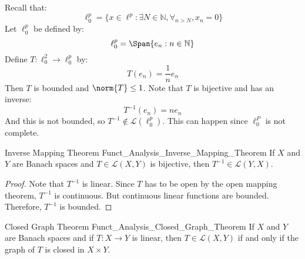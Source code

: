         \begin{lexample}
            Recall that:
            \begin{equation}
                \ell_{0}^{p}=
                \{x\in\ell^{p}:\exists{N\in\mathbb{N}},
                    \forall_{n>N},x_{n}=0\}
            \end{equation}
            Let $\ell_{0}^{p}$ be defined by:
            \begin{equation}
                \ell_{0}^{p}=\Span\{e_{n}:n\in\mathbb{N}\}
            \end{equation}
            Define $T:\ell_{0}^{2}\rightarrow\ell_{0}^{p}$ by:
            \begin{equation}
                T(e_{n})=\frac{1}{n}e_{n}
            \end{equation}
            Then $T$ is bounded and $\norm{T}\leq{1}$. Note that
            $T$ is bijective and has an inverse:
            \begin{equation}
                T^{\minus{1}}(e_{n})=ne_{n}
            \end{equation}
            And this is not bounded, so
            $T^{\minus{1}}\notin\mathcal{L}(\ell_{0}^{p})$.
            This can happen since $\ell_{0}^{P}$ is not complete.
        \end{lexample}
        \begin{ltheorem}{Inverse Mapping Theorem}
              {Funct_Analysis_Inverse_Mapping_Theorem}
            If $X$ and $Y$ are Banach spaces and
            $T\in\mathcal{L}(X,Y)$ is bijective, then
            $T^{\minus{1}}\in\mathcal{L}(Y,X)$.
        \end{ltheorem}
        \begin{proof}
            Note that $T^{\minus{1}}$ is linear. Since $T$ has to be
            open by the open mapping theorem, $T^{\minus{1}}$ is
            continuous. But continuous linear functions are bounded.
            Therefore, $T^{\minus{1}}$ is bounded.
        \end{proof}
        \begin{ltheorem}{Closed Graph Theorem}
              {Funct_Analysis_Closed_Graph_Theorem}
            If $X$ and $Y$ are Banach spaces and if
            $T:X\rightarrow{Y}$ is linear, then
            $T\in\mathcal{L}(X,Y)$ if and only if the graph of
            $T$ is closed in $X\times{Y}$.
        \end{ltheorem}
